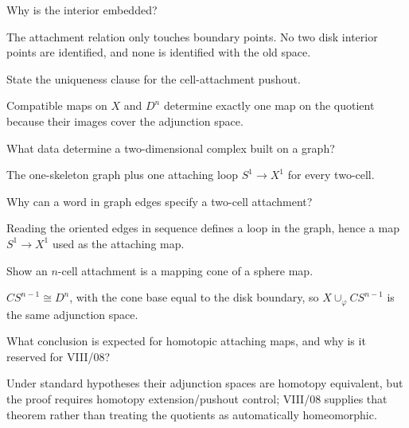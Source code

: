 \begin{problem}\label{prob:viii05-17}
Why is the interior embedded?
\end{problem}
\begin{solution}
The attachment relation only touches boundary points.  No two disk interior points are identified, and none is identified with the old space.
\end{solution}

\begin{problem}\label{prob:viii05-18}
State the uniqueness clause for the cell-attachment pushout.
\end{problem}
\begin{solution}
Compatible maps on \(X\) and \(D^n\) determine exactly one map on the quotient because their images cover the adjunction space.
\end{solution}

\begin{problem}\label{prob:viii05-19}
What data determine a two-dimensional complex built on a graph?
\end{problem}
\begin{solution}
The one-skeleton graph plus one attaching loop \(S^1\to X^1\) for every two-cell.
\end{solution}

\begin{problem}\label{prob:viii05-20}
Why can a word in graph edges specify a two-cell attachment?
\end{problem}
\begin{solution}
Reading the oriented edges in sequence defines a loop in the graph, hence a map \(S^1\to X^1\) used as the attaching map.
\end{solution}

\begin{problem}\label{prob:viii05-21}
Show an \(n\)-cell attachment is a mapping cone of a sphere map.
\end{problem}
\begin{solution}
\(CS^{n-1}\cong D^n\), with the cone base equal to the disk boundary, so \(X\cup_\varphi CS^{n-1}\) is the same adjunction space.
\end{solution}

\begin{problem}\label{prob:viii05-22}
What conclusion is expected for homotopic attaching maps, and why is it reserved for VIII/08?
\end{problem}
\begin{solution}
Under standard hypotheses their adjunction spaces are homotopy equivalent, but the proof requires homotopy extension/pushout control; VIII/08 supplies that theorem rather than treating the quotients as automatically homeomorphic.
\end{solution}

